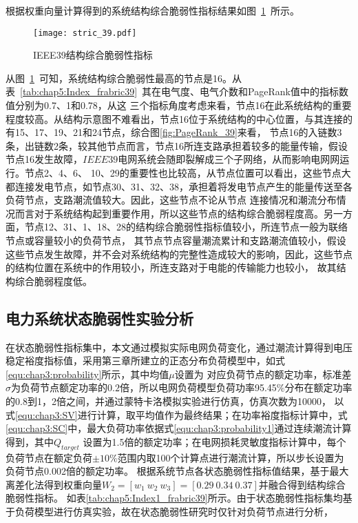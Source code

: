 根据权重向量计算得到的系统结构综合脆弱性指标结果如图~\ref{fig:stric_39}~所示。
\begin{figure}[H] %
  \centering
  \texttt{[image: stric\_39.pdf]}
  \caption{IEEE39结构综合脆弱性指标}
  \label{fig:stric_39}
\end{figure}

从图~\ref{fig:stric_39}~可知，系统结构综合脆弱性最高的节点是16。从表~\ref{tab:chap5:Index_frabric39}~其在电气度、电气介数和PageRank值中的指标数值分别为0.7、1和0.78，从这
三个指标角度考虑来看，节点16在此系统结构的重要程度较高。从结构示意图不难看出，节点16位于系统结构的中心位置，与其连接的有15、17、19、21和24节点，综合图\ref{fig:PageRank_39}来看，
节点16的入链数3条，出链数2条，较其他节点而言，节点16所连支路承担着较多的能量传输，假设节点16发生故障，$IEEE39$电网系统会随即裂解成三个子网络，从而影响电网网运行。节点2、4、6、
10、29的重要性也比较高，从节点位置可以看出，这些节点大都连接发电节点，如节点30、31、32、38，承担着将发电节点产生的能量传送至各负荷节点，支路潮流值较大。因此，这些节点不论从节点
连接情况和潮流分布情况而言对于系统结构起到重要作用，所以这些节点的结构综合脆弱程度高。另一方面，节点12、31、1、18、28的结构综合脆弱性指标值较小，所连节点一般为联络节点或容量较小的负荷节点，
其节点节点容量潮流累计和支路潮流值较小，假设这些节点发生故障，并不会对系统结构的完整性造成较大的影响，因此，这些节点的结构位置在系统中的作用较小，所连支路对于电能的传输能力也较小，
故其结构综合脆弱程度低。

\subsection{电力系统状态脆弱性实验分析}
\label{sec:singleAnalysis_status}
在状态脆弱性指标集中，本文通过模拟实际电网负荷变化，通过潮流计算得到电压稳定裕度指标值，采用第三章所建立的正态分布负荷模型中，如式\ref{equ:chap3:probability}所示，其中均值$\mu$设置为
对应负荷节点的额定功率，标准差$\sigma$为负荷节点额定功率的$0.2$倍，所以电网负荷模型负荷功率95.45$\%$分布在额定功率的0.8到1，2倍之间，并通过蒙特卡洛模拟实验进行仿真，仿真次数为10000，
以式\ref{equ:chap3:SV}进行计算，取平均值作为最终结果；在功率裕度指标计算中，式\ref{equ:chap3:SC}中，最大负荷功率依据式\ref{equ:chap3:probability1}通过连续潮流计算得到，其中$Q_{target}$
设置为1.5倍的额定功率；在电网损耗灵敏度指标计算中，每个负荷节点在额定负荷$\pm 10 \%$范围内取100个计算点进行潮流计算，所以步长设置为负荷节点0.002倍的额定功率。
根据系统节点各状态脆弱性指标值结果，基于最大离差化法得到权重向量$W_2 = \left[w_{1}\ w_{2}\ w_{3}\right]=[0.29\ 0.34\ 0.37]$并融合得到结构综合脆弱性指标。
如表\ref{tab:chap5:Index1_frabric39}所示。由于状态脆弱性指标集均基于负荷模型进行仿真实验，故在状态脆弱性研究时仅针对负荷节点进行分析，

